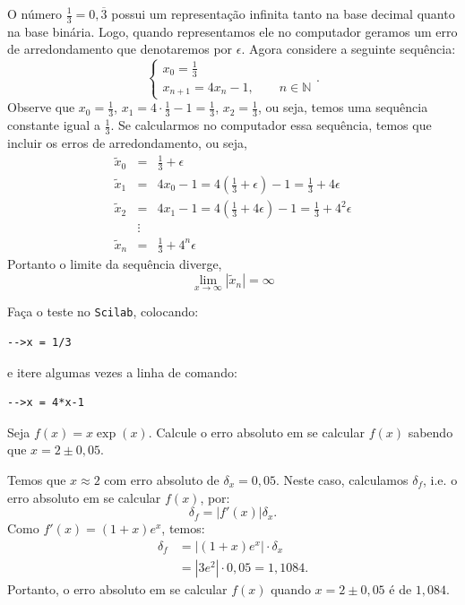 \documentclass[main.tex]{subfiles}
\begin{document}
\begin{ex}
O número $\frac{1}{3}=0,\overline{3}$ possui um representação infinita tanto na base decimal quanto na base binária. Logo, quando representamos ele no computador geramos um erro de arredondamento que denotaremos por $\epsilon$. Agora considere a seguinte sequência:
$$
\left\{\begin{array}{l}
x_0=\frac{1}{3}\\
x_{n+1}=4x_n-1,\qquad n\in\mathbb{N}
\end{array}\right..
$$
Observe que $x_0=\frac{1}{3}$, $x_1=4\cdot \frac{1}{3}-1=\frac{1}{3}$, $x_2=\frac{1}{3}$, ou seja, temos uma sequência constante igual a $\frac{1}{3}$. Se calcularmos no computador essa sequência, temos que incluir os erros de arredondamento, ou seja,
\begin{eqnarray*}
\tilde{x}_0&=&\frac{1}{3}+\epsilon\\
\tilde{x}_1&=&4x_0-1=4\left(\frac{1}{3}+\epsilon\right)-1=\frac{1}{3}+4\epsilon\\
\tilde{x}_2&=&4x_1-1=4\left(\frac{1}{3}+4\epsilon\right)-1=\frac{1}{3}+4^2\epsilon\\
&\vdots&\\
\tilde{x}_n&=&\frac{1}{3}+4^n\epsilon
\end{eqnarray*}
Portanto o limite da sequência diverge,
\begin{equation*}
\lim_{x\to\infty}|\tilde{x}_n|=\infty  
\end{equation*}

\ifisscilab
Faça o teste no \verb+Scilab+, colocando:
\begin{verbatim}
-->x = 1/3
\end{verbatim}
e itere algumas vezes a linha de comando:
\begin{verbatim}
-->x = 4*x-1
\end{verbatim}
\fi
\end{ex}



\begin{ex}
  Seja $f(x) = x\exp(x)$. Calcule o erro absoluto em se calcular $f(x)$ sabendo que $x = 2 \pm 0,05$.
\end{ex}
\begin{sol}
  Temos que $x\approx 2$ com erro absoluto de $\delta_x = 0,05$. Neste caso, calculamos $\delta_f$, i.e. o erro absoluto em se calcular $f(x)$, por:
  \begin{equation*}
    \delta_f = |f'(x)|\delta_x.
  \end{equation*}
Como $f'(x) = (1 + x)e^{x}$, temos:
\begin{align*}
  \delta_f &= |(1 + x)e^{x}|\cdot\delta_x\\
  &= |3e^2|\cdot 0,05 = 1,1084.
\end{align*}
Portanto, o erro absoluto em se calcular $f(x)$ quando $x=2\pm 0,05$ é de $1,084$.
\end{sol}
\end{document}
